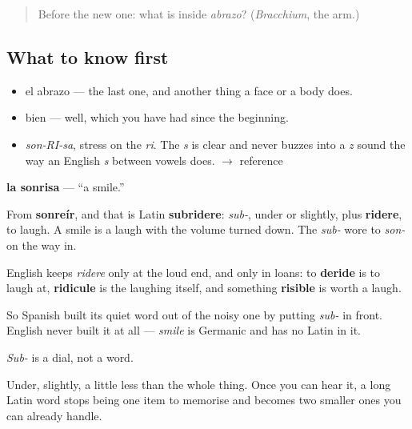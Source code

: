 \label{lesson:ES-C282-sonrisa}



\begin{quote}
Before the new one: what is inside \emph{abrazo}? (\emph{Bracchium}, the arm.)
\end{quote}

\subsection*{What to know first}
\begin{itemize}
\raggedright
  \item el abrazo — the last one, and another thing a face or a body does.
  \item bien — well, which you have had since the beginning.
\end{itemize}

\begin{sounds}
\begin{itemize}
\raggedright
  \item \emph{son-RI-sa}, stress on the \emph{ri}. The \emph{s} is clear and never buzzes into a \emph{z} sound the way an English \emph{s} between vowels does. $\to$ reference
\end{itemize}
\end{sounds}

\begin{cousinweb}
\textbf{la sonrisa} — \textquotedblleft{}a smile.\textquotedblright{}

From \textbf{sonreír}, and that is Latin \textbf{subridere}: \emph{sub-}, under or slightly, plus \textbf{ridere}, to laugh. A smile is a laugh with the volume turned down. The \emph{sub-} wore to \emph{son-} on the way in.

English keeps \emph{ridere} only at the loud end, and only in loans: to \textbf{deride} is to laugh at, \textbf{ridicule} is the laughing itself, and something \textbf{risible} is worth a laugh.

So Spanish built its quiet word out of the noisy one by putting \emph{sub-} in front. English never built it at all — \emph{smile} is Germanic and has no Latin in it.
\end{cousinweb}

\begin{grammarlens}[title={What you've built}]
\emph{Sub-} is a dial, not a word.

Under, slightly, a little less than the whole thing. Once you can hear it, a long Latin word stops being one item to memorise and becomes two smaller ones you can already handle.
\end{grammarlens}

